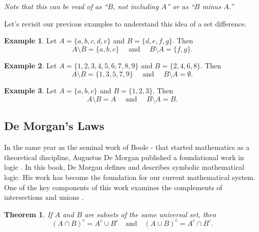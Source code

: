 \documentclass[
]{book}
\newtheorem{theorem}{Theorem}[chapter]
\theoremstyle{definition}
\theoremstyle{definition}
\newtheorem{example}{Example}[chapter]
\theoremstyle{definition}
\theoremstyle{definition}
\theoremstyle{remark}
\begin{document}
\emph{Note that this can be read of as ``\(B\), not including \(A\)'' or as ``\(B\) minus \(A\).''}

Let's revisit our previous examples to understand this idea of a set difference.

\begin{example}
Let \(A = \{a, b, c, d, e\}\) and \(B = \{ d, e, f, g\}\). Then \[A\setminus B=\{a, b, c\} \quad \mbox{ and } \quad  B\setminus A =\{ f, g\}.\]
\end{example}

\begin{example}
Let \(A=\{1,2,3,4,5,6,7,8,9\}\) and \(B=\{2,4,6,8\}\). Then
\[A \setminus B = \{1,3,5,7,9\} \quad \mbox{ and } \quad B\setminus A = \emptyset.\]
\end{example}

\begin{example}
Let \(A=\{a,b,c\}\) and \(B=\{1,2,3\}\). Then
\[A\setminus B = A \quad \mbox{ and } \quad B\setminus A =B.\]
\end{example}

\hypertarget{de-morgans-laws}{%
\subsection{De Morgan's Laws}\label{de-morgans-laws}}

In the same year as the seminal work of Boole -\citet{Boole} that started mathematics as a theoretical discipline, Augustus De Morgan published a foundational work in logic \citep{DeMorgan}. In this book, De Morgan defines and describes symbolic mathematical logic. His work has become the foundation for our current mathematical system. One of the key components of this work examines the complements of intersections and unions \citep[p.~69]{DeMorgan}.

\begin{theorem}
\protect\hypertarget{thm:DeMorgan-laws}{}\label{thm:DeMorgan-laws}If \(A\) and \(B\) are subsets of the same universal set, then
\[ \left(A \cap B\right)^c = A^c \cup B^c \quad \mbox{and} \quad \left(A \cup B \right)^c = A^c \cap B^c.\]
\end{theorem}
\end{document}
